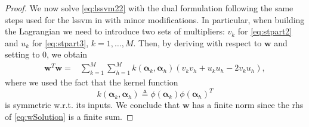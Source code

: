 \documentclass[draftcls,onecolumn,12pt]{IEEEtran}
\newcommand{\wrt}{w.r.t. }
\begin{document}
\begin{proof}
	We now solve \eqref{eq:lssvm22} with the dual formulation following the same steps used for the \ac{lssvm} in \cite{Suykens1999} with minor modifications. In particular, when building the Lagrangian we need to introduce two sets of multipliers: $v_k$ for \eqref{eq:stpart2} and $u_k$ for \eqref{eq:stpart3}, $k=1,\dots, M$. Then, by deriving with respect to $\mathbf{w}$ and setting to 0, we obtain 
	\begin{equation}
	\label{eq:wSolution}
	\begin{aligned}
	\mathbf{w}^T\mathbf{w} =&  \sum_{k=1}^{M} \sum_{h=1}^{M} k(\bm{\alpha}_k,\bm{\alpha}_h) (v_kv_h + u_ku_h -2 v_ku_h),
	\end{aligned}
	\end{equation}
	where we used the fact that the kernel function
	\begin{equation}
	k(\bm{\alpha}_k,\bm{\alpha}_h) \triangleq \phi(\bm{\alpha}_k) \phi(\bm{\alpha}_h)^T
	\end{equation} is symmetric \wrt its inputs. We conclude that $\mathbf{w}$ has a finite norm since the rhs of \eqref{eq:wSolution} is a finite sum.
	
\end{proof}
\end{document}
